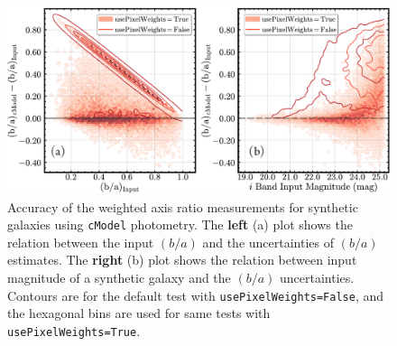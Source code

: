 \documentclass[useamsfonts]{pasj01}
\def\cmodel{\texttt{cModel}}
\begin{document}

\begin{figure}
    \begin{center}
        \includegraphics[width=\textwidth]{fig/synpipe_galaxy_ba}
    \end{center}
    \caption{
        Accuracy of the weighted axis ratio measurements for synthetic
        galaxies using \cmodel{} photometry.
      The  \textbf{left} (a) plot shows the relation between the input $(b/a)$ and the
        uncertainties of $(b/a)$ estimates.
        The \textbf{right} (b) plot shows the relation between input magnitude of a synthetic galaxy
        and the $(b/a)$ uncertainties.
        Contours are for the default test with \texttt{usePixelWeights=False}, and the
        hexagonal bins are used for same tests with \texttt{usePixelWeights=True}.
        }
    \label{fig:galaxy_ba}
\end{figure}
\end{document}
